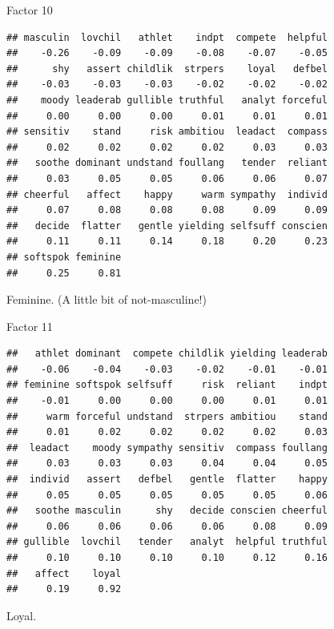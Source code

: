 \begin{frame}[fragile]{Factor 10}
  
  {\small
\begin{knitrout}
\color{fgcolor}\begin{kframe}
\begin{alltt}
\hlstd{mylist[[}\hlstd{]]}
\end{alltt}
\begin{verbatim}
## masculin  lovchil   athlet    indpt  compete  helpful 
##    -0.26    -0.09    -0.09    -0.08    -0.07    -0.05 
##      shy   assert childlik  strpers    loyal   defbel 
##    -0.03    -0.03    -0.03    -0.02    -0.02    -0.02 
##    moody leaderab gullible truthful   analyt forceful 
##     0.00     0.00     0.00     0.01     0.01     0.01 
## sensitiv    stand     risk ambitiou  leadact  compass 
##     0.02     0.02     0.02     0.02     0.03     0.03 
##   soothe dominant undstand foullang   tender  reliant 
##     0.03     0.05     0.05     0.06     0.06     0.07 
## cheerful   affect    happy     warm sympathy  individ 
##     0.07     0.08     0.08     0.08     0.09     0.09 
##   decide  flatter   gentle yielding selfsuff conscien 
##     0.11     0.11     0.14     0.18     0.20     0.23 
## softspok feminine 
##     0.25     0.81
\end{verbatim}
\end{kframe}
\end{knitrout}
}

Feminine. (A little bit of not-masculine!)

\end{frame}
\begin{frame}[fragile]{Factor 11}
  
  {\small
\begin{knitrout}
\color{fgcolor}\begin{kframe}
\begin{alltt}
\hlstd{mylist[[}\hlstd{]]}
\end{alltt}
\begin{verbatim}
##   athlet dominant  compete childlik yielding leaderab 
##    -0.06    -0.04    -0.03    -0.02    -0.01    -0.01 
## feminine softspok selfsuff     risk  reliant    indpt 
##    -0.01     0.00     0.00     0.00     0.01     0.01 
##     warm forceful undstand  strpers ambitiou    stand 
##     0.01     0.02     0.02     0.02     0.02     0.03 
##  leadact    moody sympathy sensitiv  compass foullang 
##     0.03     0.03     0.03     0.04     0.04     0.05 
##  individ   assert   defbel   gentle  flatter    happy 
##     0.05     0.05     0.05     0.05     0.05     0.06 
##   soothe masculin      shy   decide conscien cheerful 
##     0.06     0.06     0.06     0.06     0.08     0.09 
## gullible  lovchil   tender   analyt  helpful truthful 
##     0.10     0.10     0.10     0.10     0.12     0.16 
##   affect    loyal 
##     0.19     0.92
\end{verbatim}
\end{kframe}
\end{knitrout}
}

Loyal.

\end{frame}
